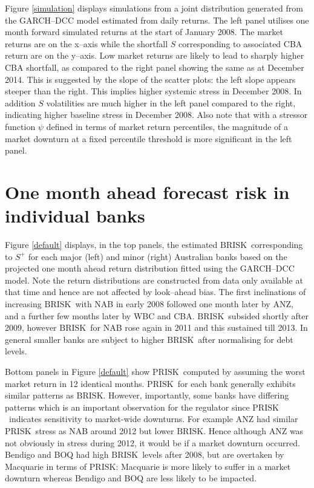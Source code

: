 \documentclass[12pt]{article}
\newcommand{\br}{\ensuremath{\mathrm{BRISK}}}
\newcommand{\pr}{\ensuremath{\mathrm{PRISK}}}
\newcommand{\fref}[1]{Figure \ref{#1}}
\begin{document}
\fref{simulation} displays simulations from a joint distribution generated from the GARCH--DCC model estimated from daily returns.  The left panel utilises  one month forward simulated returns at the start of January 2008.   The market returns are on the x--axis while the shortfall $S$ corresponding to associated CBA return are on the y--axis.  Low market returns are likely to lead to sharply higher CBA shortfall, as compared to the right panel showing the same as at December 2014.   This is suggested by the slope of the scatter plots:  the left slope appears steeper than the right. This implies higher systemic stress in December 2008. In addition $S$ volatilities are much higher in the left panel compared to the right, indicating higher baseline stress in December 2008. Also note that with a stressor function $\psi$ defined in terms of market return percentiles, the magnitude of a market downturn at a fixed percentile threshold is more significant in the left panel.

\section{One month ahead forecast risk in individual banks}\label{simulate1}

\fref{default} displays, in the top panels, the estimated \br\  corresponding to $S^+$ for each major (left) and minor (right) Australian banks based on the projected one month ahead return distribution fitted using the GARCH--DCC model.  Note the return distributions are constructed from data only available at that time and hence are not affected by look--ahead bias.  The first inclinations of increasing \br\ with NAB in early 2008 followed one month later by ANZ, and  a further few months later by WBC and CBA. \br\ subsided shortly after 2009, however \br\  for NAB rose again in 2011 and this sustained till 2013.  In general smaller banks are subject to higher \br\  after normalising for debt levels.


Bottom panels in \fref{default} show \pr\ computed by assuming the worst market return in 12 identical months. \pr\ for each bank generally exhibits similar patterns as \br. However, importantly, some banks have differing patterns which is an important observation for the regulator since \pr\ indicates sensitivity to market-wide downturns. For example ANZ had similar \pr\ stress as NAB around 2012 but lower \br. Hence although ANZ was not obviously in stress during 2012, it would be if a market downturn occurred. Bendigo and BOQ had high \br\ levels after 2008, but are overtaken by Macquarie in terms of \pr: Macquarie is more likely to suffer in a market downturn whereas Bendigo and BOQ are less likely to be impacted.
\end{document}
